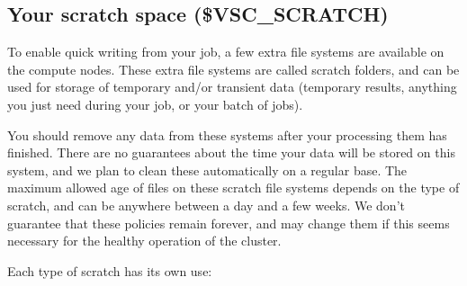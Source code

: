 \subsection{Your scratch space (\$VSC\_SCRATCH)\label{subsec:scratch-directory}}

To enable quick writing from your job, a few extra file systems are available
on the compute nodes. These extra file systems are called scratch folders, and can
be used for storage of temporary and/or transient data (temporary results,
anything you just need during your job, or your batch of jobs).

You should remove any data from these systems after your processing them has
finished. There are no guarantees about the time your data will be stored on
this system, and we plan to clean these automatically on a regular base. The
maximum allowed age of files on these scratch file systems depends on the type
of scratch, and can be anywhere between a day and a few weeks. We don't
guarantee that these policies remain forever, and may change them if this seems
necessary for the healthy operation of the cluster.

Each type of scratch has its own use:

